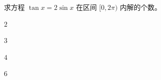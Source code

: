 \documentclass[12pt,a4paper]{exam-zh}
\begin{document}





\begin{question}
    求方程 $\tan x = 2\sin x$ 在区间 $[0, 2\pi)$ 内解的个数。\paren[C]
    \begin{choices}
        \item $2$
        \item $3$
        \item $4$
        \item $6$
    \end{choices}
\end{question}
\end{document}
